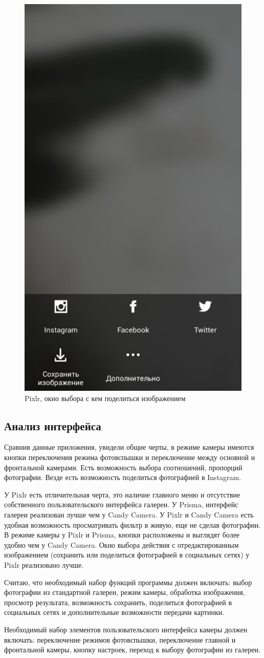 \begin{figure}[H]
	\centering
	\includegraphics[width=0.3\linewidth]{pics/pixlrPod}
	\caption{Pixlr, окно выбора с кем поделиться изображением}
	\label{fig:pixlrPod}
\end{figure}

\subsection{Анализ интерфейса}
Сравнив данные приложения, увидели общие черты, в режиме камеры имеются кнопки переключения режима фотовспышки и переключение между основной и фронтальной камерами. Есть возможность выбора соотношений, пропорций фотографии. Везде есть возможность поделиться фотографией в Instagram.

У Pixlr есть отличительная черта, это наличие главного меню и отсутствие собственного пользовательского интерфейса галереи. У Prisma, интерфейс галереи реализован лучше чем у Candy Camera. У Pixlr и Candy Camera есть удобная возможность просматривать фильтр в живую, еще не сделав фотографии. В режиме камеры у Pixlr и Prisma, кнопки расположены и выглядят более удобно чем у Candy Camera. Окно выбора действия с отредактированным изображением (сохранить или поделиться фотографией в социальных сетях) у Pixlr реализовано лучше.

Считаю, что необходимый набор функций программы должен включать: выбор фотографии из стандартной галереи, режим камеры, обработка изображения, просмотр результата, возможность сохранить, поделиться фотографией в социальных сетях и дополнительные возможности передачи картинки.

Необходимый набор элементов пользовательского интерфейса камеры должен включать: переключение режимов фотовспышки, переключение главной и фронтальной камеры, кнопку настроек, переход к выбору фотографии из галереи.

